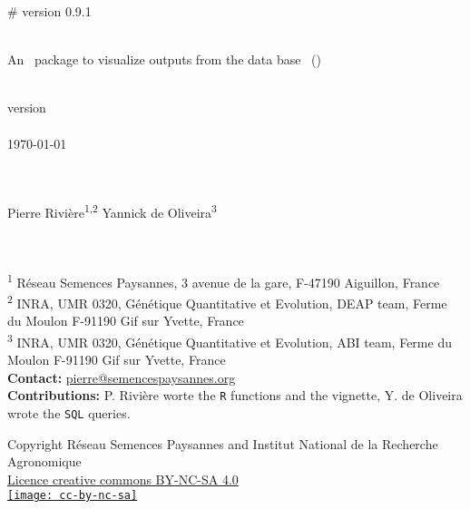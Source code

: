 # version 0.9.1
\begin{center}
\Huge{\pack } \\
\Large{An \R~package to visualize outputs from the data base \BDfull~(\BD)}

~\\

version \versionnumber \\

~\\
\today

~\\~\\

Pierre Rivi\`ere\textsuperscript{1,2} \hspace{1cm} Yannick de Oliveira\textsuperscript{3} \\
~\\~\\ 
\end{center}


\noindent\textsuperscript{1} R\'eseau Semences Paysannes, 3 avenue de la gare, F-47190 Aiguillon, France \\ 
\textsuperscript{2} INRA, UMR 0320, Génétique Quantitative et Evolution, DEAP team, Ferme du Moulon F-91190 Gif sur Yvette, France \\
\textsuperscript{3} INRA, UMR 0320, Génétique Quantitative et Evolution, ABI team, Ferme du Moulon F-91190 Gif sur Yvette, France \\
\textbf{Contact:} \href{mailto:pierre@semencespaysannes.org}{pierre@semencespaysannes.org} \\
\textbf{Contributions:} 
P. Rivière worte the \texttt{R} functions and the vignette,
Y. de Oliveira wrote the \texttt{SQL} queries.

\vfill

\begin{center}
Copyright Réseau Semences Paysannes and Institut National de la Recherche Agronomique \\
\href{http://creativecommons.org/licenses/by-nc-sa/4.0/}{Licence creative commons BY-NC-SA 4.0} \\
\vspace{.25cm}
\href{http://creativecommons.org/licenses/by-nc-sa/4.0/}{\texttt{[image: cc-by-nc-sa]}}
\end{center}

\vfill

